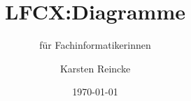 \documentclass[]{beamer}
\title{LFCX:Diagramme}
\subtitle{für Fachinformatikerinnen}
\institute{GS-LDK}
\author{Karsten Reincke}
\date{\today}
\def\cfgGl{../../../cfg.gl/}
\begin{document}

\begin{frame}
  \titlepage
\end{frame}






\logo{}
\newpage



%
\end{document}
